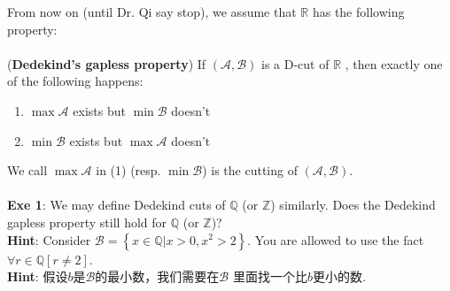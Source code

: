 \documentclass{book}
\theoremstyle{definition}
\begin{document}
From now on (until Dr. Qi say stop), we assume that $\mathbb{R}$ has the following property: \\
~\\
(\textbf{Dedekind's gapless property}) If $(\mathcal{A}, \mathcal{B})$ is a D-cut of $\mathbb{R}$ , then exactly one of the following happens:
\begin{enumerate}
    \item $\max \mathcal{A}$ exists but $\min \mathcal{B}$ doesn't 
    \item  $\min \mathcal{B}$  exists but $\max \mathcal{A}$ doesn't 
\end{enumerate}
We call $\max \mathcal{A}$ in (1) (resp. $\min \mathcal{B}$) is the cutting of $(\mathcal{A}, \mathcal{B})$.\\
~\\
\textbf{Exe 1}: We may define Dedekind cuts of $\mathbb{Q}$ (or $\mathbb{Z}$) similarly. Does the Dedekind gapless property still hold for $\mathbb{Q}$ (or $\mathbb{Z}$)?\\
\textbf{Hint}: Consider $\mathcal{B}=\left\{ x \in \mathbb{Q} | x>0, x^2>2 \right\}$. You are allowed to use the fact $\forall r \in \mathbb{Q} [r\neq2]$.\\
\textbf{Hint}: 假设$b$是$\mathcal{B}$的最小数，我们需要在$\mathcal{B}$ 里面找一个比$b$更小的数.
\end{document}
